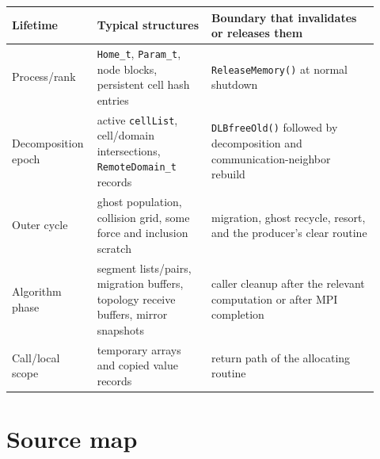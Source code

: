 \documentclass[11pt]{article}
\newcommand{\code}[1]{\texorpdfstring{\nolinkurl{#1}}{#1}}
\begin{document}
\begin{longtable}{@{}p{0.18\linewidth}p{0.30\linewidth}p{0.44\linewidth}@{}}
\toprule
Lifetime & Typical structures & Boundary that invalidates or releases them \\
\midrule
\endhead
Process/rank & \code{Home_t}, \code{Param_t}, node blocks, persistent cell
hash entries & \code{ReleaseMemory()} at normal shutdown \\
Decomposition epoch & active \code{cellList}, cell/domain intersections,
\code{RemoteDomain_t} records & \code{DLBfreeOld()} followed by decomposition
and communication-neighbor rebuild \\
Outer cycle & ghost population, collision grid, some force and inclusion
scratch & migration, ghost recycle, resort, and the producer's clear routine \\
Algorithm phase & segment lists/pairs, migration buffers, topology receive
buffers, mirror snapshots & caller cleanup after the relevant computation or
after MPI completion \\
Call/local scope & temporary arrays and copied value records & return path of
the allocating routine \\
\bottomrule
\end{longtable}

\section{Source map}
\end{document}
